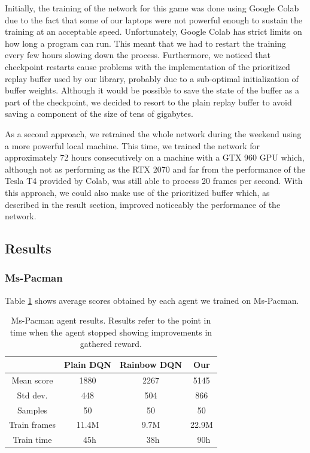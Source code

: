 \documentclass[10pt,twocolumn,letterpaper]{article}
\begin{document}
Initially, the training of the network for this game was done using Google Colab due to the fact that some of our laptops were not powerful enough to sustain the training at an acceptable speed. Unfortunately, Google Colab has strict limits on how long a program can run. This meant that we had to restart the training every few hours slowing down the process. Furthermore, we noticed that checkpoint restarts cause problems with the implementation of the prioritized replay buffer used by our library, probably due to a sub-optimal initialization of buffer weights. Although it would be possible to save the state of the buffer as a part of the checkpoint, we decided to resort to the plain replay buffer to avoid saving a component of the size of tens of gigabytes.

As a second approach, we retrained the whole network during the weekend using a more powerful local machine. This time, we trained the network for approximately 72 hours consecutively on a machine with a GTX 960 GPU which, although not as performing as the RTX 2070 and far from the performance of the Tesla T4 provided by Colab, was still able to process 20 frames per second. With this approach, we could also make use of the prioritized buffer which, as described in the result section, improved noticeably the performance of the network.

\subsection{Results}

\subsubsection{Ms-Pacman}

Table \ref{tab:pacman_results} shows average scores obtained by each agent we trained on Ms-Pacman.

\begin{table}
	\begin{center}
		\begin{tabular}{ |c|c|c|c| } 
			\hline
			 & Plain DQN & Rainbow DQN & Our \\ 
			 \hline
			Mean score & 1880 & 2267 & 5145 \\
			Std dev. & 448 & 504 & 866 \\
			Samples & 50 & 50 & 50 \\
			Train frames & 11.4M & 9.7M & 22.9M \\
			Train time & ~45h & ~38h & ~90h \\
			\hline
		\end{tabular}
	\end{center}
	\caption{Ms-Pacman agent results. Results refer to the point in time when the agent stopped showing improvements in gathered reward.}
	\label{tab:pacman_results}
\end{table}
\end{document}

